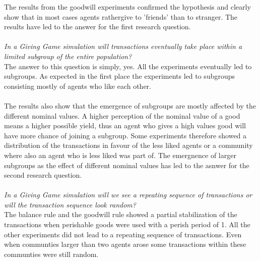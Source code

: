 \documentclass[twoside,openright]{uva-bachelor-thesis}
\begin{document}
The results from the goodwill experiments confirmed the hypothesis and clearly show that in most cases agents rathergive to 'friends' than to stranger. The results have led to the answer for the first research question. \\ 
\\
\textit{In a Giving Game simulation will transactions eventually take place within a limited subgroup of the entire population?} \\
The answer to this question is simply, yes. All the experiments eventually led to subgroups. As expected in the first place the experiments led to subgroups consisting mostly of agents who like each other.
\\
\\
The results also show that the emergence of subgroups are mostly affected by the different nominal values. A higher perception of the nominal value of a good means a higher possible yield, thus an agent who gives a high values good will have more chance of joining a subgroup. Some experiments therefore showed a distribution of the transactions in favour of the less liked agents or a community where also an agent who is less liked was part of. The emergnence of larger subgroups as the effect of different nominal values has led to the asnwer for the second research question.
\\
\\
\textit{In a Giving Game simulation will we see a repeating sequence of transactions or will the transaction sequence look random?} \\
The balance rule and the goodwill rule showed a partial stabilization of the transactions when perishable goods were used with a perish period of 1. All the other experiments did not lead to a repeating sequence of transactions. Even when communties larger than two agents arose some transactions within these communties were still random.
\end{document}
